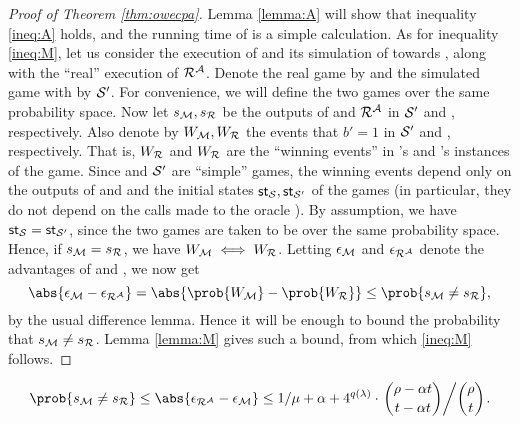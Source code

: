 \begin{proof}[Proof of Theorem \ref{thm:owecpa}]
  Lemma \ref{lemma:A} will show that inequality \eqref{ineq:A} holds,
  and the running time of \redM is a simple calculation.
  As for inequality \eqref{ineq:M}, let us consider the execution of \redM
  and its simulation of \advA towards \redR,
  along with the ``real'' execution of \(\redR^{\advA}\).
  Denote the real game by \Simple and the simulated game with \redM by \(\mathcal{S}'\).
  For convenience, we will define the two games over the same probability space.
  Now let \(s_{\redM}, s_{\redR}\) be the outputs of \redM and \(\redR^{\advA}\) in \(\mathcal{S}'\) and \Simple, respectively.
  Also denote by \(W_{\redM}, W_{\redR}\) the events that \(b' = 1\) in \(\mathcal{S}'\) and \Simple, respectively.
  That is, \(W_{\redR}\) and \(W_{\redR}\) are the ``winning events'' in \redM's and \redR's instances of the game.
  Since \Simple and \(\mathcal{S}'\) are ``simple'' games, the winning events depend only on the outputs of \redM and \redR
  and the initial states \(\mathsf{st}_{\mathcal{S}}, \mathsf{st}_{\mathcal{S}'}\) of the games
  (in particular, they do not depend on the calls made to the oracle \oracle).
  By assumption, we have \(\mathsf{st}_{\mathcal{S}} = \mathsf{st}_{\mathcal{S}'}\),
  since the two games are taken to be over the same probability space.
  Hence, if \(s_{\redM} = s_{\redR}\), we have \(W_{\redM} \iff W_{\redR}\).
  Letting \(\epsilon_{\mathcal{M}}\) and \(\epsilon_{\redR^{\advA}}\) denote the advantages of \redM and \redR, we now get
  \begin{equation}
    \abs{\epsilon_{\redM} - \epsilon_{\redR^{\advA}}} = \abs{\prob{W_{\redM}} - \prob{W_{\redR}}} \le \prob{s_{\redM} \ne s_{\redR}},
  \end{equation}
  by the usual difference lemma.
  Hence it will be enough to bound the probability that \(s_{\redM} \ne s_{\redR}\).
  Lemma \ref{lemma:M} gives such a bound, from which \eqref{ineq:M} follows.
\end{proof}

\begin{lemma}\label{lemma:M}
  \begin{equation}
    \prob{s_{\redM} \ne s_{\redR}} \le \abs{\epsilon_{\redR^{\advA}} - \epsilon_{\redM}} \le 1/\mu + \alpha
    + 4^{q(\lambda)} \cdot \left. \binom{\rho - \alpha t}{t - \alpha t} \middle/ \binom{\rho}{t} \right..
  \end{equation}
\end{lemma}


